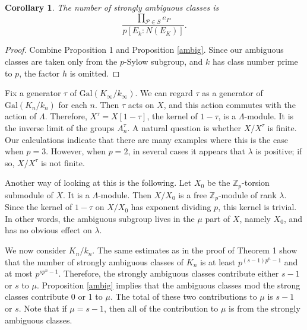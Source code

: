 \documentclass{amsart}
\newtheorem{corollary}[theorem]{Corollary}
\begin{document}
\begin{corollary}\label{strongambig} The number of strongly ambiguous classes is
$$
\frac{\prod_{\mathcal P \in S} e_P}{p [E_k  : N(E_K)]}.
$$
\end{corollary}
\begin{proof}
Combine Proposition 1 and Proposition \ref{ambig}. Since our ambiguous classes
are taken only from the $p$-Sylow subgroup, and $k$ has class number prime to $p$, the factor
$h$ is omitted. \end{proof}


Fix a generator $\tau$ of $\text{Gal}(K_\infty/k_\infty)$. We can regard $\tau$ as a generator
of $\text{Gal}(K_n/k_n)$ for each $n$. Then $\tau$ acts on $X$, and this action commutes with the action of $\Lambda$.
Therefore, $X^{\tau} = X[1-\tau]$, the kernel of $1-\tau$, is a $\Lambda$-module. It is the inverse limit
of the groups $A_n^{\tau}$. A natural question
is whether $X/X^{\tau}$ is finite. Our calculations indicate that there are many examples where this is the case
when $p=3$. However, when $p=2$, in several cases it appears that $\lambda$ is positive; if so,
$X/X^{\tau}$ is not finite.

Another way of looking at this is the following. Let $X_0$ be the $\mathbb Z_p$-torsion submodule of $X$.
It is a $\Lambda$-module. Then $X/X_0$ is a free $\mathbb Z_p$-module of rank $\lambda$. Since the kernel
of $1-\tau$ on $X/X_0$ has exponent dividing $p$, this kernel is trivial. In other words, the ambiguous
subgroup lives in the $\mu$ part of $X$, namely $X_0$, and has no obvious effect on $\lambda$.

We now consider $K_n/k_n$.
The same estimates as in the proof of Theorem 1 show that the number of strongly ambiguous classes
of $K_n$ is at least $p^{(s-1)p^n-1}$ and at most $p^{sp^n-1}$.
Therefore, the strongly ambiguous classes contribute either $s-1$ or $s$ to $\mu$.
Proposition \ref{ambig} implies that the ambiguous classes mod the strong classes contribute 0 or 1 to $\mu$.
The total of these two contributions to $\mu$ is $s-1$ or $s$. 
Note that if $\mu=s-1$, then all of the contribution to $\mu$ is from the strongly ambiguous classes.
\end{document}

